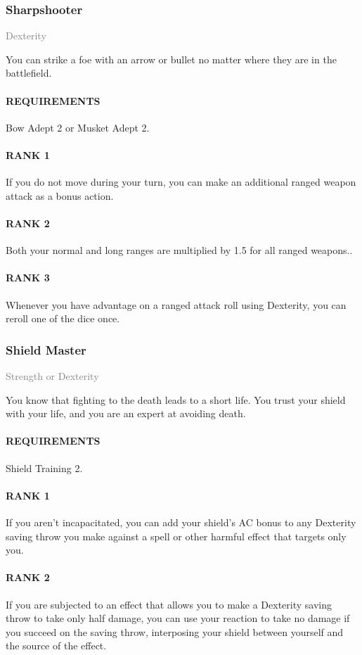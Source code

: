 \subsubsection{Sharpshooter} \label{feat::sharpshooter}
\small{\textcolor{gray}{Dexterity}}

\normalsize
You can strike a foe with an arrow or bullet no matter where they are in the battlefield.
\paragraph{REQUIREMENTS} Bow Adept 2 or Musket Adept 2.
\paragraph{RANK 1} If you do not move during your turn, you can make an additional ranged weapon attack as a bonus action.
\paragraph{RANK 2} Both your normal and long ranges are multiplied by 1.5 for all ranged weapons..
\paragraph{RANK 3} Whenever you have advantage on a ranged attack roll using Dexterity, you can reroll one of the dice once.

\subsubsection{Shield Master} \label{feat::shieldmaster}
\small{\textcolor{gray}{Strength or Dexterity}}

\normalsize
You know that fighting to the death leads to a short life.
You trust your shield with your life, and you are an expert at avoiding death.
\paragraph{REQUIREMENTS} Shield Training 2.
\paragraph{RANK 1} If you aren't incapacitated, you can add your shield's AC bonus to any Dexterity saving throw you make against a spell or other harmful effect that targets only you.
\paragraph{RANK 2} If you are subjected to an effect that allows you to make a Dexterity saving throw to take only half damage, you can use your reaction to take no damage if you succeed on the saving throw, interposing your shield between yourself and the source of the effect.
